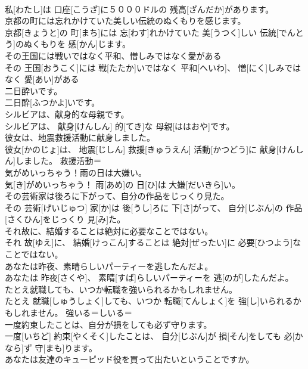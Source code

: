 \documentclass[8pt]{extreport}
\begin{document}
\begin{CJK}{UTF8}{min}
\\	私[わたし]は 口座[こうざ]に５０００ドルの 残高[ざんだか]があります。	
\\	京都の町には忘れかけていた美しい伝統のぬくもりを感じます。	
\\	京都[きょうと]の 町[まち]には 忘[わす]れかけていた 美[うつく]しい 伝統[でんとう]のぬくもりを 感[かん]じます。	
\\	その王国には戦いではなく平和、憎しみではなく愛がある	
\\	その 王国[おうこく]には 戦[たたか]いではなく 平和[へいわ]、 憎[にく]しみではなく 愛[あい]がある	
\\	二日酔いです。	
\\	二日酔[ふつかよ]いです。	
\\	シルビアは、献身的な母親です。	
\\	シルビアは、 献身[けんしん] 的[てき]な 母親[ははおや]です。	
\\	彼女は、地震救援活動に献身しました。	
\\	彼女[かのじょ]は、 地震[じしん] 救援[きゅうえん] 活動[かつどう]に 献身[けんしん]しました。	救援活動＝ 
\\	気がめいっちゃう！雨の日は大嫌い。	
\\	気[き]がめいっちゃう！ 雨[あめ]の 日[ひ]は 大嫌[だいきら]い。	
\\	その芸術家は後ろに下がって、自分の作品をじっくり見た。	
\\	その 芸術[げいじゅつ] 家[か]は 後[うし]ろに 下[さ]がって、 自分[じぶん]の 作品[さくひん]をじっくり 見[み]た。	
\\	それ故に、結婚することは絶対に必要なことではない。	
\\	それ 故[ゆえ]に、 結婚[けっこん]することは 絶対[ぜったい]に 必要[ひつよう]なことではない。	
\\	あなたは昨夜、素晴らしいパーティーを逃したんだよ。	
\\	あなたは 昨夜[さくや]、 素晴[すば]らしいパーティーを 逃[のが]したんだよ。	
\\	たとえ就職しても、いつか転職を強いられるかもしれません。	
\\	たとえ 就職[しゅうしょく]しても、いつか 転職[てんしょく]を 強[し]いられるかもしれません。	強いる＝しいる＝ 
\\	一度約束したことは、自分が損をしても必ず守ります。	
\\	一度[いちど] 約束[やくそく]したことは、 自分[じぶん]が 損[そん]をしても 必[かなら]ず 守[まも]ります。	
\\	あなたは友達のキューピッド役を買って出たいということですか。	

\end{CJK}
\end{document}
